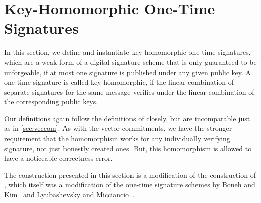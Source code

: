 
\section{Key-Homomorphic One-Time Signatures}\label{sec:otms}

In this section, we define and instantiate key-homomorphic one-time signatures, which are a weak form of a digital signature scheme that is only guaranteed to be unforgeable, if at most one signature is published under any given public key.
A one-time signature is called key-homomorphic, if the linear combination of separate signatures for the same message verifies under the linear combination of the corresponding public keys.

Our definitions again follow the definitions of \cite{CCS:FleSimZha22} closely, but are incomparable just as in \autoref{sec:veccom}.
As with the vector commitments, we have the stronger requirement that the homomorphism works for any individually verifying signature, not just honestly created ones.
But, this homomorphism is allowed to have a noticeable correctness error.

The construction presented in this section is a modification of the construction of \cite{CCS:FleSimZha22}, which itself was a modification of the one-time signature schemes by Boneh and Kim~\cite{BonKim2020} and Lyubashevsky and Micciancio~\cite{TCC:LyuMic08}.


